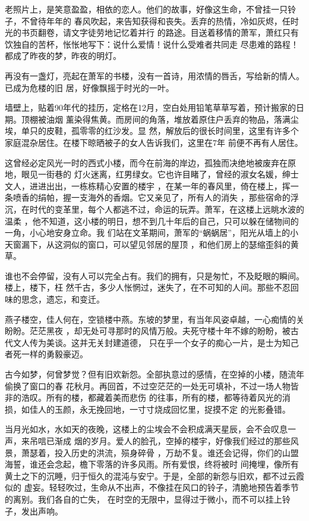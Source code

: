 \documentclass[12pt,a4paper]{article}
\begin{document}
		老照片上，是笑意盈盈，相依的恋人。他们的故事，好像这生命，不曾挂一只铃子，不曾待年年的
	春风吹起，来告知获得和丧失。丢弃的热情，冷如灰烬，任时光的书页翻卷，请文字徒劳地记忆着并行
	的路途。目送着移情的萧军，萧红只有饮独自的苦杯，怅怅地写下：说什么爱情！说什么受难者共同走
	尽患难的路程！都成了昨夜的梦，昨夜的明灯。


		再没有一盏灯，亮起在萧军的书楼，没有一首诗，用浓情的唇舌，写给新的情人。已成为危楼的旧
	居，好像飘摇于时光的一叶。

		墙壁上，贴着90年代的挂历，定格在12月，空白处用铅笔草草写着，预计搬家的日期。顶棚被油烟
	薰染得焦黄。而房间的角落，堆放着原住户丢弃的物品，落满尘埃，单只的皮鞋，孤零零的红沙发。显
	然，解放后的很长时间里，这里有许多个家庭混杂居住。在楼下晾晒被子的女人告诉我们，这里在7年
	前便不再有人居住。

		这曾经必定风光一时的西式小楼，而今在前海的岸边，孤独而决绝地被废弃在原地，眼见一街巷的
	灯火迷离，红男绿女。它也许目睹了，曾经的淑女名媛，绅士文人，进进出出，一栋栋精心安置的楼宇
	，在某一年的春风里，倚在楼上，挥一条喷香的绢帕，握一支海外的香烟。它又亲见了，所有人的消失
	，那些宿命的浮沉，在时代的变革里，每个人都逃不过，命运的玩弄。萧军，在这楼上远眺水波的温柔
	，他不知道，这小楼的明日，想不到几十年后的自己，只可以躲在储物间的一角，小心地安身立命。我
	们站在文革期间，萧军的“蜗蜗居”，阳光从墙上的小天窗漏下，从这洞似的窗口，可以望见邻居的屋顶
	，和他们房上的瑟缩歪斜的黄草。

		谁也不会停留，没有人可以完全占有。我们的拥有，只是匆忙，不及眨眼的瞬间。楼上，楼下，枉
	然千古，多少人怅惘过，迷失了，在不可知的人间。那些不忍回味的思念，遗忘，和变迁。

		燕子楼空，佳人何在，空锁楼中燕。东坡的梦里，有当年风姿卓越，一心痴情的关盼盼。茫茫黑夜
	，却无处可寻那时的风情万般。夫死守楼十年不嫁的盼盼，被古代文人传为美谈。这并无关封建道德，
	只在乎一个女子的痴心一片，是士为知己者死一样的勇毅豪迈。

		古今如梦，何曾梦觉？但有旧欢新怨。全部执意过的感情，在空掉的小楼，随流年偷换了窗口的春
	花秋月。再回首，不过空茫茫的一处无可填补，不过一场人物皆非的浩叹。所有的楼，都藏着美而悲伤
	的往事，所有的楼，都等待着风光的消损，如佳人的玉颜，永无挽回地，一寸寸烧成回忆里，捉摸不定
	的光影叠错。

		当月光如水，水如天的夜晚，这楼上的尘埃会不会积成满天星辰，会不会叹息一声，来吊唁已渐成
	烟的岁月。爱人的脸孔，空掉的楼宇，好像我们经过的那些风景，萧瑟着，投入历史的洪流，殒身碎骨
	，万劫不复。谁还会记得，你们的山盟海誓，谁还会念起，檐下零落的许多风雨。所有爱恨，终将被时
	间掩埋，像所有黄土之下的沉睡，归于恒久的混沌与安宁。于是，全部的新怨与旧欢，都不过云霞似的
	虚妄。轻轻吹过，生命从不出声，不像挂在风口的铃子，清脆地预告着季节的离别。我们各自的亡失，
	在时空的无限中，显得过于微小，而不可以挂上铃子，发出声响。
\end{document}
